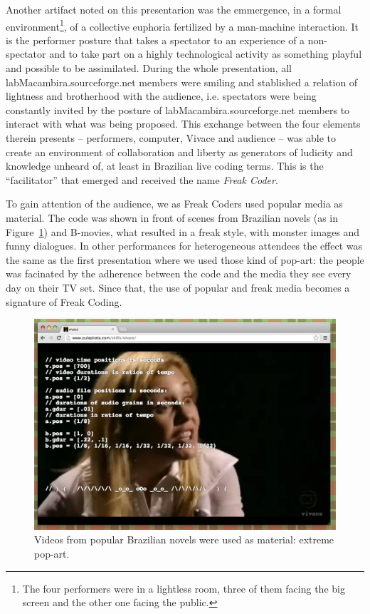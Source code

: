 \documentclass[letterpaper, 12pt]{article}
\begin{document}
Another artifact noted on this presentarion was the emmergence, in a
formal environment\footnote{The four performers were in a lightless
  room, three of them facing the big screen and the other one facing
  the public.}, of a collective euphoria fertilized by a man-machine
interaction. It is the performer posture that takes a spectator to an
experience of a non-spectator and to take part on a highly
technological activity as something playful and possible to be
assimilated.  During the whole presentation, all
labMacambira.sourceforge.net members were smiling and stablished a
relation of lightness and brotherhood with the audience,
i.e. spectators were being constantly invited by the posture of
labMacambira.sourceforge.net members to interact with what was being
proposed.  This exchange between the four elements therein presents --
performers, computer, Vivace and audience -- was able to create an
environment of collaboration and liberty as generators of ludicity and
knowledge unheard of, at least in Brazilian live coding terms. This is
the ``facilitator'' that emerged and received the name \emph{Freak
  Coder}.

To gain attention of the audience, we as Freak Coders used popular
media as material. The code was shown in front of scenes from
Brazilian novels (as in Figure~\ref{fig:novela}) and B-movies, what
resulted in a freak style, with monster images and funny dialogues. In
other performances for heterogeneous attendees the effect was the same
as the first presentation where we used those kind of pop-art: the
people was facinated by the adherence between the code and the media
they see every day on their TV set. Since that, the use of popular and
freak media becomes a signature of Freak Coding.

\begin{figure}[htpb]
  \begin{center}
    \includegraphics[scale=.3]{img/fig_novela.png}
    \caption{Videos from popular Brazilian novels were used as
      material: extreme pop-art.}
    \label{fig:novela}
  \end{center}
\end{figure}
\end{document}
